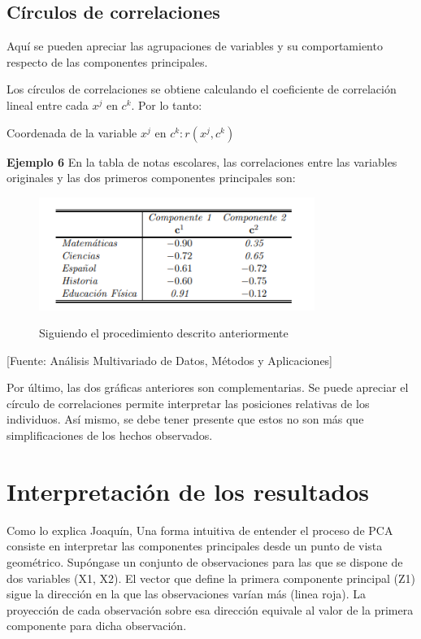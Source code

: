  
 \subsection{Círculos de correlaciones}
 Aquí se pueden apreciar las agrupaciones de variables y su comportamiento respecto de las componentes principales.  
 
 Los círculos de correlaciones se obtiene calculando el coeficiente de correlación lineal entre cada $x^\textit{j}$ en $c^{k}$. Por lo tanto:
\begin{center}
    
    Coordenada de la variable $x^\textit{j}$ en $ c^{k}: r(x^\textit{j},c^{k})$
    
\end{center} 
 
\textbf{Ejemplo 6} En la tabla de notas escolares, las correlaciones entre las variables originales y las dos primeros componentes principales son:

 \begin{figure}[H]
        \centering
        \caption{Siguiendo el procedimiento descrito anteriormente}
        \includegraphics[width=0.8\textwidth]{figures/circulo.png}
        \label{ejemplo6}
\end{figure}
\begin{center}
    [Fuente:  Análisis Multivariado de Datos, Métodos y Aplicaciones]\cite{CastilloGonzalez}
\end{center}

 
 Por último, las dos gráficas anteriores son complementarias. Se puede apreciar el círculo de correlaciones permite interpretar las posiciones relativas de los individuos.
 Así mismo, se debe tener presente que estos no son más que simplificaciones de los hechos observados.
 
 
 \section{Interpretación de los resultados}
 

Como lo explica Joaquín\cite{interpretacion},
Una forma intuitiva de entender el proceso de PCA consiste en interpretar las componentes principales desde un punto de vista geométrico. Supóngase un conjunto de observaciones para las que se dispone de dos variables (X1, X2). El vector que define la primera componente principal (Z1) sigue la dirección en la que las observaciones varían más (linea roja). La proyección de cada observación sobre esa dirección equivale al valor de la primera componente para dicha observación. 

